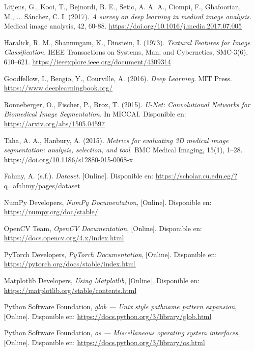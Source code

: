 \documentclass[12pt]{article}
\begin{document}
\begin{thebibliography}{9}

Litjens, G., Kooi, T., Bejnordi, B. E., Setio, A. A. A., Ciompi, F., Ghafoorian, M., ... Sánchez, C. I. (2017). \textit{A survey on deep learning in medical image analysis}. Medical image analysis, 42, 60-88. \url{https://doi.org/10.1016/j.media.2017.07.005}

Haralick, R. M., Shanmugam, K., Dinstein, I. (1973). \textit{Textural Features for Image Classification}. IEEE Transactions on Systems, Man, and Cybernetics, SMC-3(6), 610–621.
\url{https://ieeexplore.ieee.org/document/4309314}

Goodfellow, I., Bengio, Y., Courville, A. (2016). \textit{Deep Learning}. MIT Press.
\url{https://www.deeplearningbook.org/}

Ronneberger, O., Fischer, P., Brox, T. (2015). \textit{U-Net: Convolutional Networks for Biomedical Image Segmentation}. In MICCAI. Disponible en: \url{https://arxiv.org/abs/1505.04597}

Taha, A. A., Hanbury, A. (2015). \textit{Metrics for evaluating 3D medical image segmentation: analysis, selection, and tool}. BMC Medical Imaging, 15(1), 1–28.
\url{https://doi.org/10.1186/s12880-015-0068-x}

Fahmy, A. (s.f.). \textit{Dataset}. [Online]. Disponible en: \url{https://scholar.cu.edu.eg/?q=afahmy/pages/dataset}


NumPy Developers, \textit{NumPy Documentation}, [Online]. Disponible en: \url{https://numpy.org/doc/stable/}

OpenCV Team, \textit{OpenCV Documentation}, [Online]. Disponible en: \url{https://docs.opencv.org/4.x/index.html}

PyTorch Developers, \textit{PyTorch Documentation}, [Online]. Disponible en: \url{https://pytorch.org/docs/stable/index.html}

Matplotlib Developers, \textit{Using Matplotlib}, [Online]. Disponible en: \url{https://matplotlib.org/stable/contents.html}

Python Software Foundation, \textit{glob — Unix style pathname pattern expansion}, [Online]. Disponible en: \url{https://docs.python.org/3/library/glob.html}

Python Software Foundation, \textit{os — Miscellaneous operating system interfaces}, [Online]. Disponible en: \url{https://docs.python.org/3/library/os.html}


\end{thebibliography}
\end{document}

